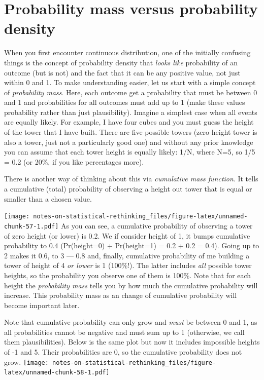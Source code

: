 \documentclass[
]{book}
\begin{document}
\hypertarget{probability-mass-versus-probability-density}{%
\chapter{Probability mass versus probability density}\label{probability-mass-versus-probability-density}}

When you first encounter continuous distribution, one of the initially confusing things is the concept of probability density that \emph{looks like} probability of an outcome (but is not) and the fact that it can be any positive value, not just within 0 and 1. To make understanding easier, let us start with a simple concept of \emph{probability mass}. Here, each outcome get a probability that must be between 0 and 1 and probabilities for all outcomes must add up to 1 (make these values probability rather than just plausibility). Imagine a simplest case when all events are equally likely. For example, I have four cubes and you must guess the height of the tower that I have built. There are five possible towers (zero-height tower is also a tower, just not a particularly good one) and without any prior knowledge you can assume that each tower height is equally likely: 1/N, where N=5, so 1/5 = 0.2 (or 20\%, if you like percentages more).

There is another way of thinking about this via \emph{cumulative mass function}. It tells a cumulative (total) probability of observing a height out tower that is equal or smaller than a chosen value.

\texttt{[image: notes-on-statistical-rethinking\_files/figure-latex/unnamed-chunk-57-1.pdf]}
As you can see, a cumulative probability of observing a tower of zero height (or lower) is 0.2. We if consider height of 1, it bumps cumulative probability to 0.4 (Pr(height=0) + Pr(height=1) = 0.2 + 0.2 = 0.4). Going up to 2 makes it 0.6, to 3 --- 0.8 and, finally, cumulative probability of me building a tower of height of 4 \emph{or lower} is 1 (100\%!). The latter includes \emph{all} possible tower heights, so the probability you observe one of them is 100\%. Note that for each height the \emph{probability mass} tells you by how much the cumulative probability will increase. This probability mass as an change of cumulative probability will become important later.

Note that cumulative probability can only grow and \emph{must} be between 0 and 1, as all probabilities cannot be negative and must sum up to 1 (otherwise, we call them plausibilities). Below is the same plot but now it includes impossible heights of -1 and 5. Their probabilities are 0, so the cumulative probability does not grow.
\texttt{[image: notes-on-statistical-rethinking\_files/figure-latex/unnamed-chunk-58-1.pdf]}
\end{document}
